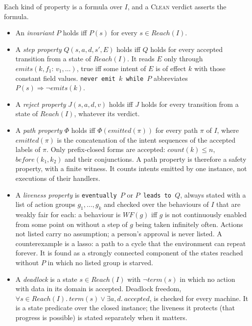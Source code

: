 \documentclass[11pt]{article}
\begin{document}
Each kind of property is a formula over $I$, and a \textsc{Clean} verdict asserts the formula.
\begin{itemize}
\item An \emph{invariant} $P$ holds iff $P(s)$ for every $s \in \mathit{Reach}(I)$.
\item A \emph{step property} $Q(s, a, d, s', E)$ holds iff $Q$ holds for every accepted transition from a state of $\mathit{Reach}(I)$. It reads $E$ only through $\mathit{emits}(k, f_1{:}\,v_1, \ldots)$, true iff some intent of $E$ is of effect $k$ with those constant field values. \texttt{never emit $k$ while $P$} abbreviates $P(s) \Rightarrow \neg\mathit{emits}(k)$.
\item A \emph{reject property} $J(s, a, d, v)$ holds iff $J$ holds for every transition from a state of $\mathit{Reach}(I)$, whatever its verdict.
\item A \emph{path property} $\Phi$ holds iff $\Phi(\mathit{emitted}(\pi))$ for every path $\pi$ of $I$, where $\mathit{emitted}(\pi)$ is the concatenation of the intent sequences of the accepted labels of $\pi$. Only prefix-closed forms are accepted: $\mathit{count}(k) \le n$, $\mathit{before}(k_1, k_2)$ and their conjunctions. A path property is therefore a safety property, with a finite witness. It counts intents emitted by one instance, not executions of their handlers.
\item A \emph{liveness property} is \texttt{eventually $P$} or \texttt{$P$ leads to $Q$}, always stated with a list of action groups $g_1, \ldots, g_k$ and checked over the behaviours of $I$ that are weakly fair for each: a behaviour is $\mathit{WF}(g)$ iff $g$ is not continuously enabled from some point on without a step of $g$ being taken infinitely often. Actions not listed carry no assumption; a person's approval is never listed. A counterexample is a lasso: a path to a cycle that the environment can repeat forever. It is found as a strongly connected component of the states reached without $P$ in which no listed group is starved.
\item A \emph{deadlock} is a state $s \in \mathit{Reach}(I)$ with $\neg\mathit{term}(s)$ in which no action with data in its domain is accepted. Deadlock freedom, $\forall s \in \mathit{Reach}(I).\ \mathit{term}(s) \vee \exists a, d.\ \mathit{accepted}$, is checked for every machine. It is a state predicate over the closed instance; the liveness it protects (that progress is possible) is stated separately when it matters.
\end{itemize}
\end{document}
